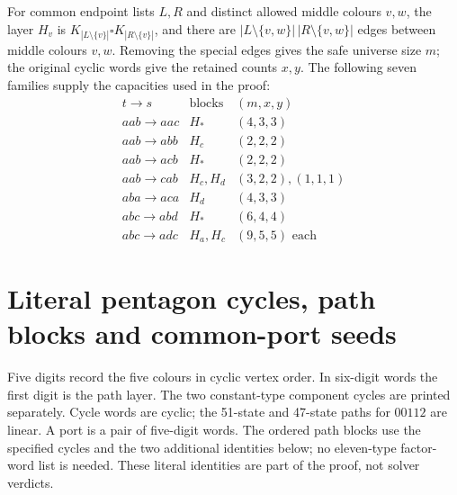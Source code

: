 For common endpoint lists $L,R$ and distinct allowed middle colours $v,w$,
the layer $H_v$ is
$K_{|L\setminus\{v\}|}\square K_{|R\setminus\{v\}|}$, and there are
$|L\setminus\{v,w\}|\,|R\setminus\{v,w\}|$ edges between middle
colours $v,w$. Removing the special edges gives the safe universe
size $m$; the original cyclic words give the retained counts $x,y$.
The following seven families supply the capacities used in the proof:
\[
\begin{array}{c|c|c}
t\to s&\text{blocks}&(m,x,y)\\\hline
aab\to aac&H_*&(4,3,3)\\
aab\to abb&H_c&(2,2,2)\\
aab\to acb&H_*&(2,2,2)\\
aab\to cab&H_c,H_d&(3,2,2),(1,1,1)\\
aba\to aca&H_d&(4,3,3)\\
abc\to abd&H_*&(6,4,4)\\
abc\to adc&H_a,H_c&(9,5,5)\text{ each}
\end{array}
\]
\section{Literal pentagon cycles, path blocks and common-port seeds}
\label{app:pentagon-factor-words}
Five digits record the five colours in cyclic vertex order. In six-digit
words the first digit is the path layer. The two constant-type component
cycles are printed separately. Cycle words are cyclic; the
51-state and 47-state paths for $00112$ are linear.
A port is a pair of five-digit words.
The ordered path blocks use the specified cycles and the two
additional identities below; no eleven-type factor-word list is needed.
These literal identities are part of the proof, not solver verdicts.

